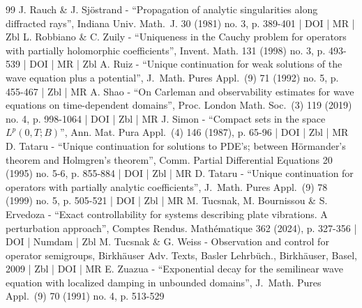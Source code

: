 \documentclass[10pt]{amsart}
\theoremstyle{definition}
\begin{document}
\begin{thebibliography}{99}
J. Rauch \& J. Sjöstrand - “Propagation of analytic singularities along diffracted rays”, Indiana Univ. Math. J. 30 (1981) no. 3, p. 389-401 | DOI | MR | Zbl
L. Robbiano \& C. Zuily - “Uniqueness in the Cauchy problem for operators with partially holomorphic coefficients”, Invent. Math. 131 (1998) no. 3, p. 493-539 | DOI | MR | Zbl
A. Ruiz - “Unique continuation for weak solutions of the wave equation plus a potential”, J. Math. Pures Appl. (9) 71 (1992) no. 5, p. 455-467 | Zbl | MR
A. Shao - “On Carleman and observability estimates for wave equations on time-dependent domains”, Proc. London Math. Soc. (3) 119 (2019) no. 4, p. 998-1064 | DOI | Zbl | MR
J. Simon - “Compact sets in the space $L^p(0,T;B)$”, Ann. Mat. Pura Appl. (4) 146 (1987), p. 65-96 | DOI | Zbl | MR
D. Tataru - “Unique continuation for solutions to PDE’s; between Hörmander’s theorem and Holmgren’s theorem”, Comm. Partial Differential Equations 20 (1995) no. 5-6, p. 855-884 | DOI | Zbl | MR
D. Tataru - “Unique continuation for operators with partially analytic coefficients”, J. Math. Pures Appl. (9) 78 (1999) no. 5, p. 505-521 | DOI | Zbl | MR
M. Tucsnak, M. Bournissou \& S. Ervedoza - “Exact controllability for systems describing plate vibrations. A perturbation approach”, Comptes Rendus. Mathématique 362 (2024), p. 327-356 | DOI | Numdam | Zbl
M. Tucsnak \& G. Weiss - Observation and control for operator semigroups, Birkhäuser Adv. Texts, Basler Lehrbüch., Birkhäuser, Basel, 2009 | Zbl | DOI | MR
E. Zuazua - “Exponential decay for the semilinear wave equation with localized damping in unbounded domains”, J. Math. Pures Appl. (9) 70 (1991) no. 4, p. 513-529
\end{thebibliography}
\end{document}
